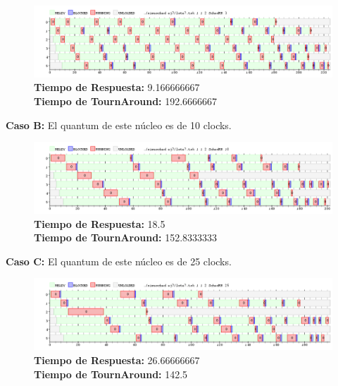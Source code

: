 \documentclass[a4paper]{article}
\begin{document}
	 \begin{figure}[h!]
   \begin{center}
 	\includegraphics[scale=0.5]{imagenes/ej7/1nucleoA.png}
 	\textbf{Tiempo de Respuesta:} 9.166666667\\
 	\textbf{Tiempo de TournAround:} 192.6666667\\
   \end{center}
 \end{figure} 
	
	
	\textbf{Caso B:} El quantum de este n\'ucleo es de 10 clocks.
	
		 \begin{figure}[h!]
   \begin{center}
 	\includegraphics[scale=0.5]{imagenes/ej7/1nucleoB.png}
 	\textbf{Tiempo de Respuesta:} 18.5 \\
 	\textbf{Tiempo de TournAround:} 152.8333333\\
   \end{center}
 \end{figure} 
	
	\textbf{Caso C:} El quantum de este n\'ucleo es de 25 clocks.

		 \begin{figure}[h!]
   \begin{center}
 	\includegraphics[scale=0.5]{imagenes/ej7/1nucleoC.png}
 	\textbf{Tiempo de Respuesta:} 26.66666667 \\
 	\textbf{Tiempo de TournAround:} 142.5 \\
   \end{center}
 \end{figure} 	
	
\end{document}
